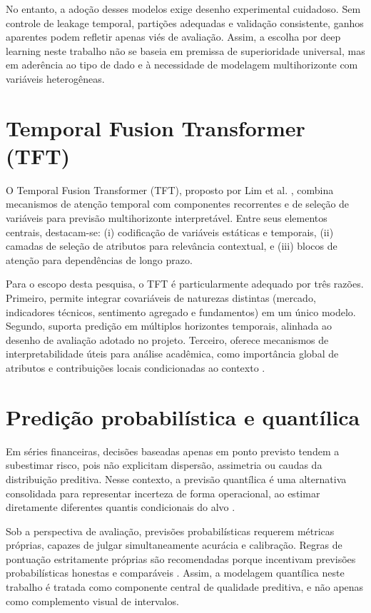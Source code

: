 No entanto, a adoção desses modelos exige desenho experimental cuidadoso. Sem controle de leakage temporal, partições adequadas e validação consistente, ganhos aparentes podem refletir apenas viés de avaliação. Assim, a escolha por deep learning neste trabalho não se baseia em premissa de superioridade universal, mas em aderência ao tipo de dado e à necessidade de modelagem multihorizonte com variáveis heterogêneas.

\section{Temporal Fusion Transformer (TFT)}
O Temporal Fusion Transformer (TFT), proposto por Lim et al. \cite{LIMETAL2021TFT}, combina mecanismos de atenção temporal com componentes recorrentes e de seleção de variáveis para previsão multihorizonte interpretável. Entre seus elementos centrais, destacam-se: (i) codificação de variáveis estáticas e temporais, (ii) camadas de seleção de atributos para relevância contextual, e (iii) blocos de atenção para dependências de longo prazo.

Para o escopo desta pesquisa, o TFT é particularmente adequado por três razões. Primeiro, permite integrar covariáveis de naturezas distintas (mercado, indicadores técnicos, sentimento agregado e fundamentos) em um único modelo. Segundo, suporta predição em múltiplos horizontes temporais, alinhada ao desenho de avaliação adotado no projeto. Terceiro, oferece mecanismos de interpretabilidade úteis para análise acadêmica, como importância global de atributos e contribuições locais condicionadas ao contexto \cite{LIMETAL2021TFT}.

\section{Predição probabilística e quantílica}
Em séries financeiras, decisões baseadas apenas em ponto previsto tendem a subestimar risco, pois não explicitam dispersão, assimetria ou caudas da distribuição preditiva. Nesse contexto, a previsão quantílica é uma alternativa consolidada para representar incerteza de forma operacional, ao estimar diretamente diferentes quantis condicionais do alvo \cite{KOENKERBASSETT1978}.

Sob a perspectiva de avaliação, previsões probabilísticas requerem métricas próprias, capazes de julgar simultaneamente acurácia e calibração. Regras de pontuação estritamente próprias são recomendadas porque incentivam previsões probabilísticas honestas e comparáveis \cite{GNEITING2007}. Assim, a modelagem quantílica neste trabalho é tratada como componente central de qualidade preditiva, e não apenas como complemento visual de intervalos.

